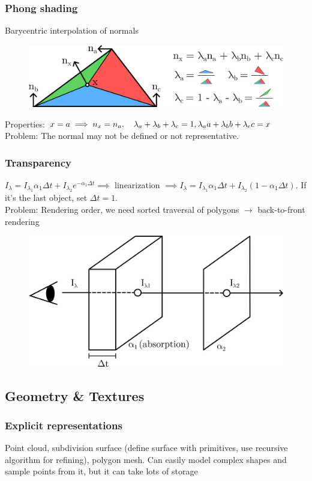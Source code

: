 \documentclass[a4paper,10pt]{article}
\begin{document}
\subsubsection{Phong shading} Barycentric interpolation of normals
\begin{figure}[h]
    \includegraphics[width=\linewidth]{phong-shading.png}
\end{figure}

Properties: \( x = a \implies n_x = n_a, \quad \lambda_a+\lambda_b +\lambda_c = 1, \\ \lambda_a a+ \lambda_b b + \lambda_c c = x \)
Problem: The normal may not be defined or not representative.

\newpage
\subsubsection{Transparency} \( I_\lambda = I_{\lambda_1} \alpha_1 \Delta t + I_{\lambda_2} e^{-\alpha_1 \Delta t} \implies \) linearization \( \implies I_\lambda = I_{\lambda_1} \alpha_1 \Delta t + I_{\lambda_2} (1-\alpha_1 \Delta t) \). If it's the last object, set \( \Delta t = 1 \). \\
Problem: Rendering order, we need sorted traversal of polygons \( \to  \) back-to-front rendering

\begin{figure}[h]
    \centering
    \includegraphics[width=0.6\linewidth]{transparency.png}
\end{figure}

\subsection{Geometry \& Textures}
\subsubsection{Explicit representations} Point cloud, subdivision surface (define surface with primitives, use recursive algorithm for refining), polygon mesh. Can easily model complex shapes and sample points from it, but it can take lots of storage
\end{document}
